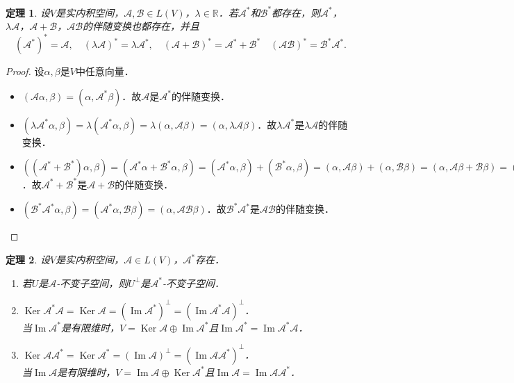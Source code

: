 \documentclass[a4paper,fontset=windows]{ctexbook}
\newtheorem{theorem}{定理}[chapter]
\theoremstyle{definition}
\DeclareMathOperator{\im}{Im}
\DeclareMathOperator{\Ker}{Ker}
\begin{document}
\begin{theorem}
设$V$是实内积空间，$\mathcal{A},\mathcal{B}\in L(V)$，$\lambda\in\mathbb{R}$．若$\mathcal{A}^*$和$\mathcal{B}^*$都存在，则$\mathcal{A}^*$，$\lambda\mathcal{A}$，$\mathcal{A+B}$，$\mathcal{AB}$的伴随变换也都存在，并且
$$(\mathcal{A}^*)^*=\mathcal{A},\quad(\lambda\mathcal{A})^*=\lambda\mathcal{A}^*,\quad(\mathcal{A+B})^*=\mathcal{A}^*+\mathcal{B}^*\quad(\mathcal{AB})^*=\mathcal{B}^*\mathcal{A}^*.$$
\end{theorem}

\begin{proof}
设$\alpha,\beta$是$V$中任意向量．
\begin{itemize}
\item $(\mathcal{A}\alpha,\beta)=(\alpha,\mathcal{A}^*\beta)$．故$\mathcal{A}$是$\mathcal{A}^*$的伴随变换．

\item $(\lambda\mathcal{A}^*\alpha,\beta)=\lambda(\mathcal{A}^*\alpha,\beta)=\lambda(\alpha,\mathcal{A}\beta)=(\alpha,\lambda\mathcal{A}\beta)$．故$\lambda\mathcal{A}^*$是$\lambda\mathcal{A}$的伴随变换．

\item $((\mathcal{A}^*+\mathcal{B}^*)\alpha,\beta)=(\mathcal{A}^*\alpha+\mathcal{B}^*\alpha,\beta)=(\mathcal{A}^*\alpha,\beta)+(\mathcal{B}^*\alpha,\beta)=(\alpha,\mathcal{A}\beta)+(\alpha,\mathcal{B}\beta)=(\alpha,\mathcal{A}\beta+\mathcal{B}\beta)=(\alpha,(\mathcal{A+B})\beta)$．故$\mathcal{A}^*+\mathcal{B}^*$是$\mathcal{A+B}$的伴随变换．

\item $(\mathcal{B}^*\mathcal{A}^*\alpha,\beta)=(\mathcal{A}^*\alpha,\mathcal{B}\beta)=(\alpha,\mathcal{A}\mathcal{B}\beta)$．故$\mathcal{B}^*\mathcal{A}^*$是$\mathcal{AB}$的伴随变换．\qedhere
\end{itemize}
\end{proof}

\begin{theorem}\label{thm10.17}
设$V$是实内积空间，$\mathcal{A}\in L(V)$，$\mathcal{A}^*$存在．
\begin{enumerate}
\item 若$U$是$\mathcal{A}$-不变子空间，则$U^\perp$是$\mathcal{A}^*$-不变子空间．

\item $\Ker\mathcal{A}^*\mathcal{A}=\Ker\mathcal{A}=(\im\mathcal{A}^*)^\perp=(\im\mathcal{A^*A})^\perp$．\\
当$\im\mathcal{A}^*$是有限维时，$V=\Ker\mathcal{A}\oplus\im\mathcal{A}^*$且$\im\mathcal{A}^*=\im\mathcal{A}^*\mathcal{A}$．

\item $\Ker\mathcal{AA^*}=\Ker\mathcal{A}^*=(\im\mathcal{A})^\perp=(\im\mathcal{AA^*})^\perp$．\\
当$\im\mathcal{A}$是有限维时，$V=\im\mathcal{A}\oplus\Ker\mathcal{A}^*$且$\im\mathcal{A}=\im\mathcal{A}\mathcal{A}^*$．
\end{enumerate}
\end{theorem}
\end{document}
